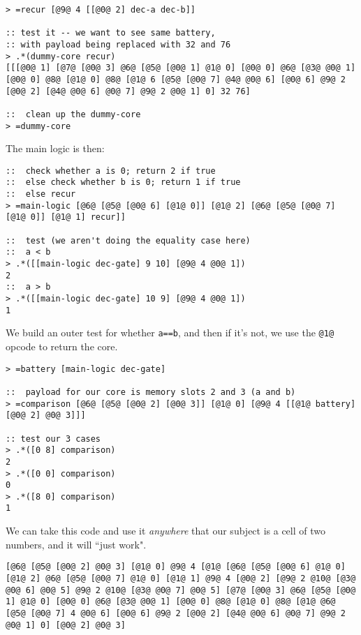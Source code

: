 \documentclass[twoside]{article}
\begin{document}
\begin{lstlisting}[style=listingcode]
> =recur [@9@ 4 [[@0@ 2] dec-a dec-b]]

:: test it -- we want to see same battery,
:: with payload being replaced with 32 and 76
> .*(dummy-core recur)
[[[@0@ 1] [@7@ [@0@ 3] @6@ [@5@ [@0@ 1] @1@ 0] [@0@ 0] @6@ [@3@ @0@ 1] [@0@ 0] @8@ [@1@ 0] @8@ [@1@ 6 [@5@ [@0@ 7] @4@ @0@ 6] [@0@ 6] @9@ 2 [@0@ 2] [@4@ @0@ 6] @0@ 7] @9@ 2 @0@ 1] 0] 32 76]

::  clean up the dummy-core
> =dummy-core
\end{lstlisting}

The main logic is then:

\begin{lstlisting}[style=listingcode]
::  check whether a is 0; return 2 if true
::  else check whether b is 0; return 1 if true
::  else recur
> =main-logic [@6@ [@5@ [@0@ 6] [@1@ 0]] [@1@ 2] [@6@ [@5@ [@0@ 7] [@1@ 0]] [@1@ 1] recur]]

::  test (we aren't doing the equality case here)
::  a < b
> .*([[main-logic dec-gate] 9 10] [@9@ 4 @0@ 1])
2
::  a > b
> .*([[main-logic dec-gate] 10 9] [@9@ 4 @0@ 1])
1
\end{lstlisting}


We build an outer test for whether \lstinline[style=inlinecode]{a==b}, and then if it's not, we use the \lstinline[style=inlinecode]{@1@} opcode to return the core.

\begin{lstlisting}[style=listingcode]
> =battery [main-logic dec-gate]

::  payload for our core is memory slots 2 and 3 (a and b)
> =comparison [@6@ [@5@ [@0@ 2] [@0@ 3]] [@1@ 0] [@9@ 4 [[@1@ battery] [@0@ 2] @0@ 3]]]

:: test our 3 cases
> .*([0 8] comparison)
2
> .*([0 0] comparison)
0
> .*([8 0] comparison)
1
\end{lstlisting}

We can take this code and use it \emph{anywhere} that our subject is a cell of two numbers, and it will ``just work".

\begin{lstlisting}[style=listingcode]
[@6@ [@5@ [@0@ 2] @0@ 3] [@1@ 0] @9@ 4 [@1@ [@6@ [@5@ [@0@ 6] @1@ 0] [@1@ 2] @6@ [@5@ [@0@ 7] @1@ 0] [@1@ 1] @9@ 4 [@0@ 2] [@9@ 2 @10@ [@3@ @0@ 6] @0@ 5] @9@ 2 @10@ [@3@ @0@ 7] @0@ 5] [@7@ [@0@ 3] @6@ [@5@ [@0@ 1] @1@ 0] [@0@ 0] @6@ [@3@ @0@ 1] [@0@ 0] @8@ [@1@ 0] @8@ [@1@ @6@ [@5@ [@0@ 7] 4 @0@ 6] [@0@ 6] @9@ 2 [@0@ 2] [@4@ @0@ 6] @0@ 7] @9@ 2 @0@ 1] 0] [@0@ 2] @0@ 3]
\end{lstlisting}
\end{document}
